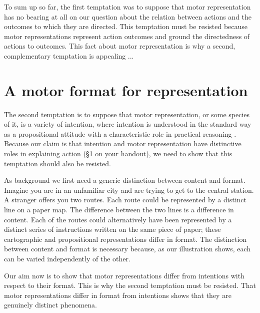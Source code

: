 \documentclass[12pt,\papersize]{extarticle}
\begin{document}
To sum up so far, the first temptation was to suppose that motor representation has no bearing at all on our question about the relation between actions and the outcomes to which they are directed. 
This temptation must be resisted because
motor representations represent action outcomes and ground the directedness of actions to outcomes.  
This fact about motor representation is why a second, complementary temptation is appealing ...

\section{A motor format for representation}

The second temptation is to suppose that motor representation, or some species of it, is a variety of intention, where intention is understood in the standard way as a propositional attitude with a characteristic role in practical reasoning \citep{Bratman:1987xw}. 
Because our claim is that intention and motor representation have distinctive roles in explaining action (§1 on your handout),
we need to show that this temptation should also be resisted. 

As background we first need a generic distinction between content and format. Imagine you are in an unfamiliar city and are trying to get to the central station. A stranger offers you two routes. Each route could be represented by a distinct line on a paper map. The difference between the two lines is a difference in content. Each of the routes could alternatively have been represented by a distinct series of instructions written on the same piece of paper; these cartographic and propositional representations differ in format. 
The distinction between content and format is necessary because, as our illustration shows, each can be varied independently of the other.

Our aim now is to show that motor representations differ from intentions with respect to their format. This is why the second temptation must be resisted. That motor representations differ in format from intentions shows that they are genuinely distinct phenomena.
\end{document}
